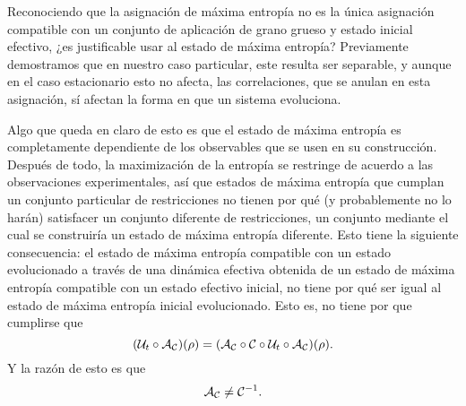 Reconociendo que la asignación de máxima entropía no es la única asignación compatible con un conjunto de aplicación de grano grueso y estado inicial efectivo, ¿es justificable usar al estado de máxima entropía? Previamente demostramos que en nuestro caso particular, este resulta ser separable, y aunque en el caso estacionario esto no afecta, las correlaciones, que se anulan en esta asignación, sí afectan la forma en que un sistema evoluciona.

Algo que queda en claro de esto es que el estado de máxima entropía es completamente dependiente de los observables que se usen en su construcción. Después de todo, la maximización de la entropía se restringe de acuerdo a las observaciones experimentales, así que estados de máxima entropía que cumplan un conjunto particular de restricciones no tienen por qué (y probablemente no lo harán) satisfacer un conjunto diferente de restricciones, un conjunto mediante el cual se construiría un estado de máxima entropía diferente. Esto tiene la siguiente consecuencia: el estado de máxima entropía compatible con un estado evolucionado a través de una dinámica efectiva obtenida de un estado de máxima entropía compatible con un estado efectivo inicial, no tiene por qué ser igual al estado de máxima entropía inicial evolucionado. Esto es, no tiene por que cumplirse que
\begin{equation}
    (\mathcal{U}_{t}\circ\mathcal{A}_{\mathcal{C}})(\rho) = (\mathcal{A}_{\mathcal{C}}\circ\mathcal{C} \circ \mathcal{U}_t \circ \mathcal{A}_{\mathcal{C}})(\rho).\nonumber
\end{equation}
Y la razón de esto es que
\begin{equation}
    \mathcal{A}_{\mathcal{C}}\neq\mathcal{C}^{-1}.\nonumber
\end{equation}

